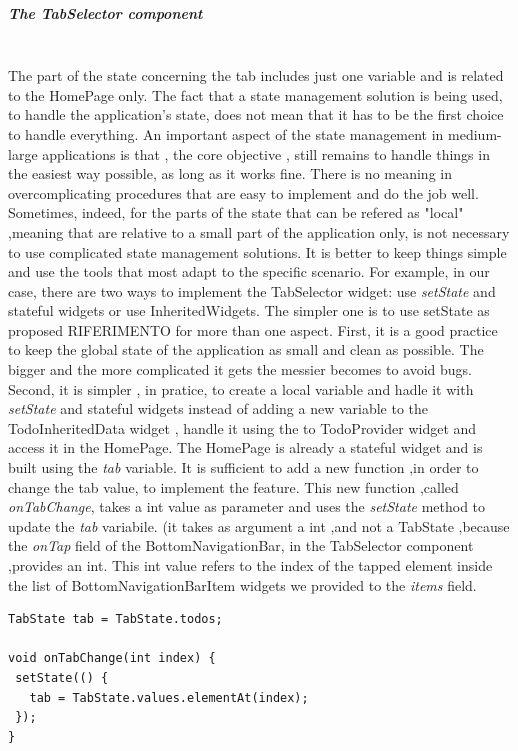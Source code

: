 \subparagraph{The TabSelector component}\mbox{}\\
\label{subpar:todo_app_inherited_widget_tabselector_component}
The part of the state concerning the tab includes just one variable and is related to the HomePage only. The fact that a state management solution is being used, to handle the application's state, does not mean that it has to be the first choice to handle everything. An important aspect of the state management in medium-large applications is that , the core objective , still remains to handle things in the easiest way possible, as long as it works fine. There is no meaning in overcomplicating procedures that are easy to implement and do the job well. Sometimes, indeed, for the parts of the state that can be refered as "local" ,meaning that are relative to a small part of the application only, is not necessary to use complicated state management solutions. It is better to keep things simple and use the tools that most adapt to the specific scenario.
For example, in our case, there are two ways to implement the TabSelector widget: use \textit{setState} and stateful widgets or use InheritedWidgets. The simpler one is to use setState as proposed RIFERIMENTO for more than one aspect. First, it is a good practice to keep the global state of the application as small and clean as possible. The bigger and the more complicated it gets the messier becomes to avoid bugs. Second, it is simpler , in pratice, to create a local variable and hadle it with \textit{setState} and stateful widgets instead of adding a new variable to the TodoInheritedData widget , handle it using the to TodoProvider widget and  access it in the HomePage. The HomePage is already a stateful widget and is built using the \textit{tab }variable. It is sufficient to add a new function ,in order to change the tab value, to implement the feature. This new function ,called \textit{onTabChange}, takes a int value as parameter and uses the \textit{setState} method to update the \textit{tab} variabile. (it takes as argument a int ,and not a TabState ,because the \textit{onTap} field of the BottomNavigationBar, in the TabSelector component ,provides an int. This int value refers to the index of the tapped element inside the list of BottomNavigationBarItem widgets we provided to the \textit{items} field.
\mbox{}\\
\begin{code}

\begin{verbatim}
TabState tab = TabState.todos;

void onTabChange(int index) {
 setState(() {
   tab = TabState.values.elementAt(index);
 });
}
\end{verbatim}
\end{code}
\mbox{}\\

